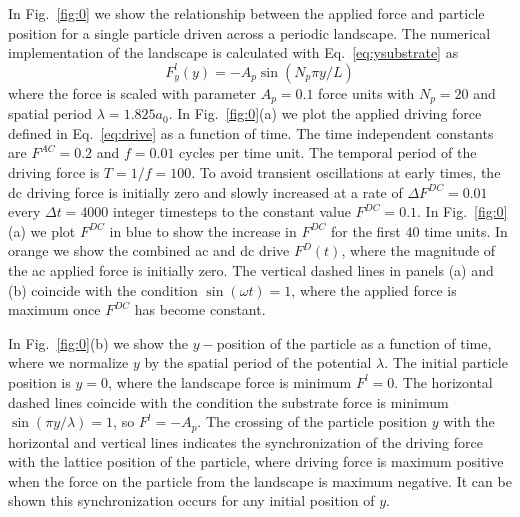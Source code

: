 \documentclass[twocolumn,preprintnumbers,amsmath,amssymb,aps,prx]{revtex4}
\begin{document}
In Fig.~\ref{fig:0} we
show the relationship between the applied force and particle
position %
for 
a single particle driven across a periodic landscape. 
%
The numerical implementation of the landscape 
is calculated with Eq.~\ref{eq:ysubstrate} as 
\begin{equation}
  \label{eq:force}
  F^l_y(y) = -A_{p} \sin{(N_p \pi y / L)} 
\end{equation}
where the force is scaled with parameter $A_{p} = 0.1$ force units 
with $N_p=20$ %
and spatial period $\lambda = 1.825 a_0$.
%
In Fig.~\ref{fig:0}(a)
we plot the applied driving force defined in Eq.~\ref{eq:drive}
as a function of time.
The time independent constants are 
$F^{AC}=0.2$ and $f=0.01$ cycles per time unit.
The temporal period of the driving force is
$T = 1/f = 100$.
To avoid transient oscillations at early times, 
the dc driving force is initially zero   
and 
slowly increased %
at a rate of $\Delta F^{DC} = 0.01$ every $\Delta t = 4000$ integer timesteps 
to the constant value $F^{DC}=0.1$.
In Fig.~\ref{fig:0}(a) we plot $F^{DC}$
in blue to show the increase in 
$F^{DC}$ for the first $40$ time units.
In orange we show 
the combined ac and dc drive $F^D(t)$,
where 
the magnitude of the ac applied force is initially zero.
The vertical dashed lines in panels (a) and (b) coincide
with the condition $\sin{(\omega t)} = 1$,
where the applied force is maximum once $F^{DC}$ has become constant.



In Fig.~\ref{fig:0}(b) 
we show the $y-$position of the particle
as a function of time,
where we 
normalize $y$ by the spatial period of the potential %
$\lambda$.
The initial particle position is $y=0$,
where the landscape force is minimum $F^l = 0$.
The horizontal dashed lines
coincide with the condition the substrate force is
minimum 
$\sin{(\pi y / \lambda)} = 1 $, so $F^l = -A_p$.
The crossing of the particle position $y$
with the horizontal and vertical lines
indicates the synchronization
of the driving force with the lattice position of the particle,
where driving force is maximum positive when the
force on the particle from the landscape is maximum negative.
It can be shown this synchronization
occurs for any initial position of $y$.
\end{document}
